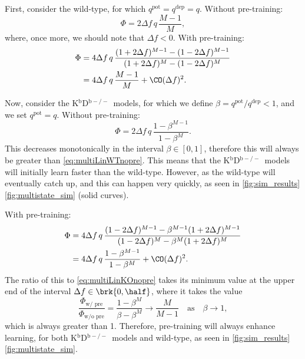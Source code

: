 \documentclass[10pt]{article}
\newcommand{\pot}{^{\text{pot}}}
\newcommand{\dep}{^{\text{dep}}}
\newcommand{\KO}{K$^\mathrm{b}$D$^{\mathrm{b}-/-}$}
\begin{document}
First, consider the wild-type, for which $q\pot=q\dep=q$.
Without pre-training:
%
\begin{equation}\label{eq:multiLinWTnopre}
  \Phi = 2{\Delta f}\,q\,\frac{M-1}{M},
\end{equation}
%
where, once more, we should note that $\Delta f<0$.
With pre-training:
%
\begin{equation}\label{eq:multiLinWTpre}
\begin{aligned}
  \Phi &= 4{\Delta f}\, q \, \frac{(1+2\Delta f)^{M-1} - (1-2\Delta f)^{M-1}}
          {(1+2\Delta f)^M - (1-2\Delta f)^M} \\
       &= {4{\Delta f}\, q}\,\frac{M-1}{M} + \CO(\Delta f)^2.
\end{aligned}
\end{equation}
%

Now, consider the \KO\ models, for which we define $\beta=q\pot/q\dep<1$, and we set $q\pot=q$.
Without pre-training:
%
\begin{equation}\label{eq:multiLinKOnopre}
  \Phi = 2{\Delta f}\, q\,\frac{1-\beta^{M-1}}{1-\beta^M}.
\end{equation}
%
This decreases monotonically in the interval $\beta\in[0,1]$, therefore this will always be greater than \eqref{eq:multiLinWTnopre}.
This means that the \KO\ models will initially learn faster than the wild-type.
However, as the wild-type will eventually catch up, and this can happen very quickly, as seen in
\autoref{fig:sim_results}\ref{fig:multistate_sim} %
(solid curves).

With pre-training:
%
\begin{equation}\label{eq:multiLinKOpre}
\begin{aligned}
  \Phi &= 4{\Delta f}\, q \, \frac{(1-2\Delta f)^{M-1} - \beta^{M-1}(1+2\Delta f)^{M-1}}
          {(1-2\Delta f)^M - \beta^M(1+2\Delta f)^M} \\
       &= 4{\Delta f}\, q\,\frac{1-\beta^{M-1}}{1-\beta^M} + \CO(\Delta f)^2.
\end{aligned}
\end{equation}
%
The ratio of this to \eqref{eq:multiLinKOnopre} takes its minimum value at the upper end of the interval $\Delta f \in \brk{0,\half}$, where it takes the value
%
\begin{equation}\label{eq:multiLinprenopre}
  \frac{\Phi_{\text{w/ pre}}}{\Phi_{\text{w/o pre}}} = \frac{1-\beta^M}{\beta-\beta^M}
   \longrightarrow \frac{M}{M-1} \quad \text{as} \quad \beta\to1,
\end{equation}
%
which is always greater than 1.
Therefore, pre-training will always enhance learning, for both \KO\ models and wild-type, as seen in
\autoref{fig:sim_results}\ref{fig:multistate_sim}. %
\end{document}
